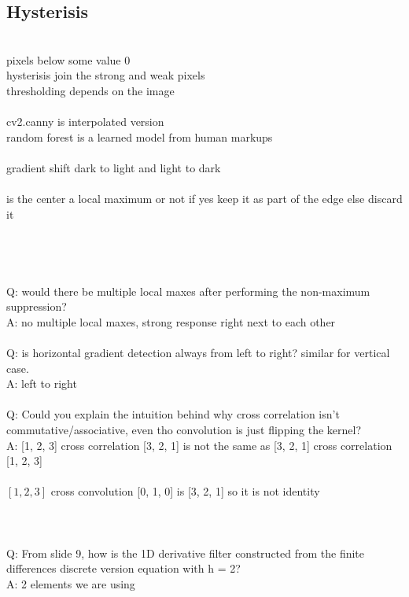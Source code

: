 \documentclass[11pt]{article}
\begin{document}
\subsection*{Hysterisis}\\
pixels below some value 0\\
hysterisis join the strong and weak pixels\\
thresholding depends on the image\\
\\
cv2.canny is interpolated version
\\
random forest is a learned model from human markups\\
\\gradient shift dark to light and light to dark
\\\\
is the center a local maximum or not
if yes keep it as part of the edge else discard it
\\
\\\\
\
\\\\
Q: would there be multiple local maxes after performing the non-maximum suppression?\\
A: no multiple local maxes, strong response right next to each other
\\\\
Q: is horizontal gradient detection always from left to right? similar for vertical case.\\
A: left to right\\
\\
Q: Could you explain the intuition behind why cross correlation isn't commutative/associative, even tho convolution is just flipping the kernel?
\\
A: [1, 2, 3] cross correlation [3, 2, 1] is not the same as [3, 2, 1] cross correlation [1, 2, 3]
\\\\
$[1, 2, 3]$ cross convolution [0, 1, 0] is [3, 2, 1] so it is not identity
\\
\\\\\\
Q: From slide 9, how is the 1D derivative filter constructed from the finite differences discrete version equation with h = 2?\\
A: 2 elements we are using 
\\\\
\end{document}

